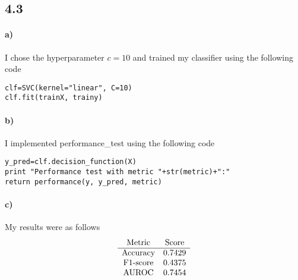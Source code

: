 \documentclass[12pt]{article}
\begin{document}
\subsection*{4.3}

\paragraph{a)}

I chose the hyperparameter \(c=10\) and trained my classifier using the following code
\begin{verbatim}
clf=SVC(kernel="linear", C=10)
clf.fit(trainX, trainy)
\end{verbatim}

\paragraph{b)}

I implemented performance\_test using the following code
\begin{verbatim}
y_pred=clf.decision_function(X)
print "Performance test with metric "+str(metric)+":"
return performance(y, y_pred, metric)
\end{verbatim}

\paragraph{c)}

My results were as follows
\[
        \begin{array}{c c}
                \text{Metric} & \text{Score}\\
                \hline
                \text{Accuracy} & 0.7429\\
                \text{F1-score} & 0.4375\\
                \text{AUROC} & 0.7454
        \end{array}
\]
\end{document}
